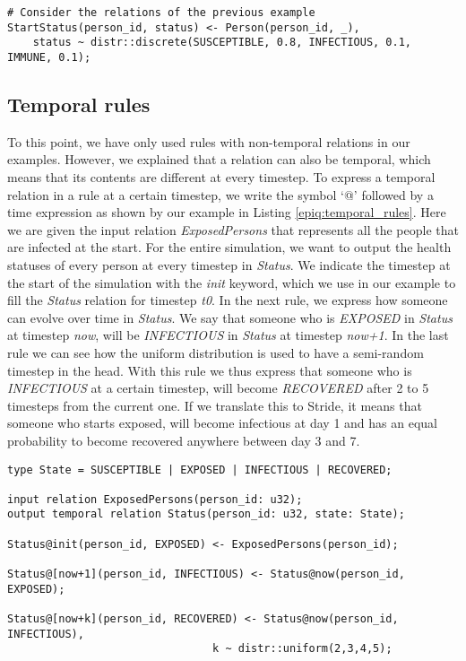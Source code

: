 \begin{lstlisting}[float, caption={Discrete distribution.}, label={epiq:discrete}]
# Consider the relations of the previous example
StartStatus(person_id, status) <- Person(person_id, _),
    status ~ distr::discrete(SUSCEPTIBLE, 0.8, INFECTIOUS, 0.1, IMMUNE, 0.1);
\end{lstlisting}

\subsection{Temporal rules}
\label{subsec:temporal_rules}
To this point, we have only used rules with non-temporal relations in our examples. However, we explained that a relation can also be temporal, which means that its contents are different at every timestep. To express a temporal relation in a rule at a certain timestep, we write the symbol `@' followed by a time expression as shown by our example in Listing \ref{epiq:temporal_rules}. Here we are given the input relation \textit{ExposedPersons} that represents all the people that are infected at the start. For the entire simulation, we want to output the health statuses of every person at every timestep in \textit{Status}. We indicate the timestep at the start of the simulation with the \textit{init} keyword, which we use in our example to fill the \textit{Status} relation for timestep \textit{t0}. In the next rule, we express how someone can evolve over time in \textit{Status}. We say that someone who is \textit{EXPOSED} in \textit{Status} at timestep \textit{now}, will be \textit{INFECTIOUS} in \textit{Status} at timestep \textit{now+1}. In the last rule we can see how the uniform distribution is used to have a semi-random timestep in the head. With this rule we thus express that someone who is \textit{INFECTIOUS} at a certain timestep, will become \textit{RECOVERED} after 2 to 5 timesteps from the current one. If we translate this to Stride, it means that someone who starts exposed, will become infectious at day 1 and has an equal probability to become recovered anywhere between day 3 and 7.

\begin{lstlisting}[caption={Temporal rules.}, label={epiq:temporal_rules}]
type State = SUSCEPTIBLE | EXPOSED | INFECTIOUS | RECOVERED;

input relation ExposedPersons(person_id: u32);
output temporal relation Status(person_id: u32, state: State);

Status@init(person_id, EXPOSED) <- ExposedPersons(person_id);

Status@[now+1](person_id, INFECTIOUS) <- Status@now(person_id, EXPOSED);

Status@[now+k](person_id, RECOVERED) <- Status@now(person_id, INFECTIOUS),
                                k ~ distr::uniform(2,3,4,5);
\end{lstlisting}

